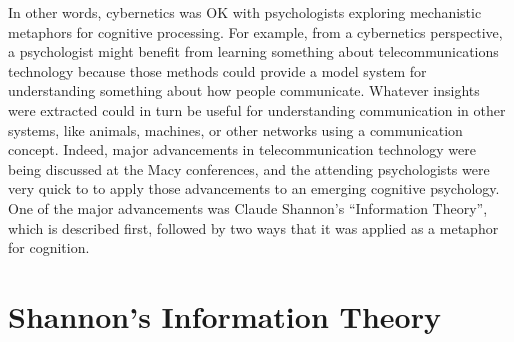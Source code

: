 \documentclass[
  oneside,
  12pt]{crumpbook}
\begin{document}
In other words, cybernetics was OK with psychologists exploring mechanistic metaphors for cognitive processing. For example, from a cybernetics perspective, a psychologist might benefit from learning something about telecommunications technology because those methods could provide a model system for understanding something about how people communicate. Whatever insights were extracted could in turn be useful for understanding communication in other systems, like animals, machines, or other networks using a communication concept. Indeed, major advancements in telecommunication technology were being discussed at the Macy conferences, and the attending psychologists were very quick to to apply those advancements to an emerging cognitive psychology. One of the major advancements was Claude Shannon's ``Information Theory'', which is described first, followed by two ways that it was applied as a metaphor for cognition.

\hypertarget{shannons-information-theory}{%
\section{Shannon's Information Theory}\label{shannons-information-theory}}
\end{document}
